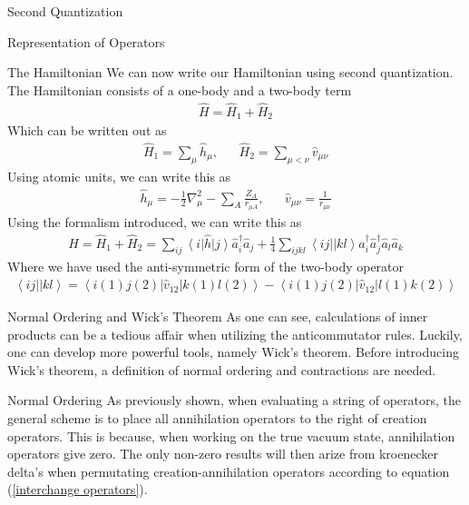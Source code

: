 \documentclass[twoside,english]{uiofysmaster}
\begin{document}
\begin{chapter}{Second Quantization}
\begin{section}{Representation of Operators}
		\begin{subsection}{The Hamiltonian}
			We can now write our Hamiltonian using second quantization. The Hamiltonian consists of a one-body and a two-body term
			\begin{align}
				\hat H = \hat H_1 + \hat H_2
			\end{align}
			Which can be written out as
			\begin{align}
				\hat H_1 = \sum_\mu \hat h_\mu, \:\;\;\;\;\; \hat H_2 = \sum_{\mu < \nu} \hat v_{\mu \nu}
			\end{align}
			Using atomic units, we can write this as
			\begin{align}
				\hat h_\mu = -\frac{1}{2}\nabla_\mu^2 - \sum_A \frac{Z_A}{r_{\mu A}}, \:\;\;\;\;\; \hat v_{\mu \nu} = \frac{1}{r_{\mu \nu}}
			\end{align}
			Using the formalism introduced, we can write this as
			\begin{align}
				\hat H = \hat H_1 + \hat H_2 = \sum_{ij} \left<i \right| \hat h \left| j \right> \hat a_i^\dagger \hat a_j 
						+ \frac{1}{4} \sum_{ijkl} \left<ij|| kl \right> \hat a_i^\dagger \hat a_j^\dagger \hat a_l \hat a_k
			\end{align}
			Where we have used the anti-symmetric form of the two-body operator
			\begin{align}
				\left<ij|| kl \right> = \left< i(1) j(2) \right| \hat v_{12} \left| k(1) l(2) \right> - \left< i(1) j(2) \right| \hat v_{12} \left| l(1) k(2) \right>
			\end{align}
		\end{subsection}

	\end{section}

	\begin{section}{Normal Ordering and Wick's Theorem}
		As one can see, calculations of inner products can be a tedious affair when utilizing the anticommutator rules. Luckily, one can develop more powerful tools, namely Wick's theorem. Before introducing Wick's theorem, a definition of normal ordering and contractions are needed.
		\begin{subsection}{Normal Ordering}
			As previously shown, when evaluating a string of operators, the general scheme is to place all annihilation operators to the right of creation operators. This is because, when working on the true vacuum state, annihilation operators give zero. The only non-zero results will then arize from kroenecker delta's when permutating creation-annihilation operators according to equation (\ref{interchange operators}). 


\end{subsection}
\end{section}
\end{chapter}
\end{document}
